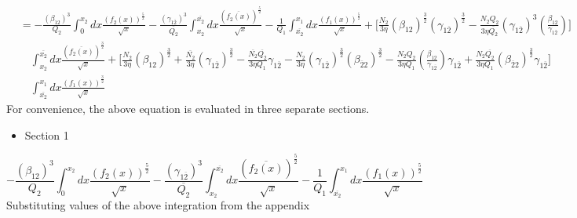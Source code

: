 \documentclass[fleqn, 10pt]{article}
\begin{document}
 \begin{equation}
 \begin{split}
     &= - \frac{(\beta_{12})^3}{Q_2} \int^{x_2}_0 dx \frac{(f_2(x))^\frac{5}{2}}{\sqrt{x}} - \frac{(\gamma_{1\overline{2}})^3}{\overline{Q_{2}}} \int^{\overline{x_{2}}}_{x_2} dx \frac{(\overline{f_{2}(x)})^\frac{5}{2}}{\sqrt{x}} - \frac{1}{Q_1} \int^{x_1}_{\overline{x_{2}}} dx \frac{(f_1(x))^\frac{5}{2}}{\sqrt{x}} + \Biggl[ \frac{N_2}{3 \eta} (\beta_{12})^\frac{3}{2} (\gamma_{1\overline{2}})^\frac{3}{2} - \frac{N_2 Q_2}{3 \eta \overline{Q_{2}}} (\gamma_{1\overline{2}})^3 \left( \frac{\beta_{12}}{\gamma_{1\overline{2}}}\right) \Biggr] \\ & \quad \int^{\overline{x_{2}}}_{x_2} dx \frac{(\overline{f_{2}(x)})^\frac{3}{2}}{\sqrt{x}} + \Biggl[ \frac{N_2}{3 \eta} (\beta_{12})^\frac{3}{2} + \frac{\overline{N_{2}}}{3 \eta} (\gamma_{1\overline{2}})^\frac{3}{2} - \frac{\overline{N_{2}} \overline{Q_{2}}}{3 \eta Q_1} \gamma_{1\overline{2}} - \frac{N_2}{3 \eta} (\gamma_{1\overline{2}})^\frac{3}{2} (\beta_{\overline{2}2})^\frac{3}{2} - \frac{N_2 Q_2}{3 \eta Q_1}\left( \frac{\beta_{12}}{\gamma_{1\overline{2}}}\right) \gamma_{1\overline{2}} + \frac{N_2 \overline{Q_{2}}}{3 \eta Q_1} (\beta_{\overline{2}2})^\frac{3}{2} \gamma_{1\overline{2}} \Biggr] \\ & \quad \int^{x_1}_{\overline{x_{2}}} dx \frac{(f_1(x))^\frac{3}{2}}{\sqrt{x}} 
     \end{split}
     \label{95}
 \end{equation}
 For convenience, the above equation is evaluated in three separate sections.
 \begin{itemize}
     \item Section 1
 \end{itemize}
 \begin{equation}
   - \frac{(\beta_{12})^3}{Q_2} \int^{x_2}_0 dx \frac{(f_2(x))^\frac{5}{2}}{\sqrt{x}} - \frac{(\gamma_{1\overline{2}})^3}{\overline{Q_{2}}} \int^{\overline{x_{2}}}_{x_2} dx \frac{(\overline{f_{2}(x)})^\frac{5}{2}}{\sqrt{x}} - \frac{1}{Q_1} \int^{x_1}_{\overline{x_{2}}} dx \frac{(f_1(x))^\frac{5}{2}}{\sqrt{x}}
   \label{96}
\end{equation}
Substituting values of the above integration from the appendix
\end{document}

